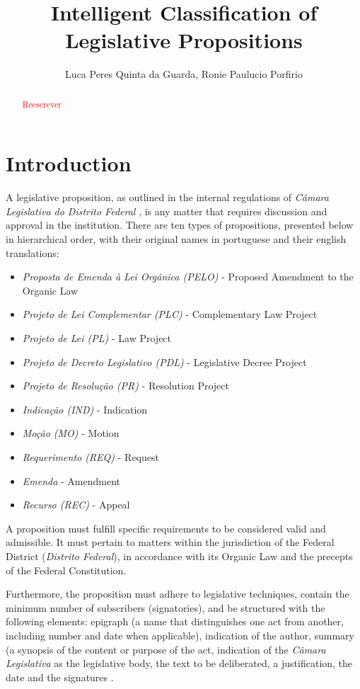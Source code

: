 \documentclass[12pt]{article}
\title{Intelligent Classification of Legislative Propositions}
\author{Luca Peres Quinta da Guarda\inst{1}, Ronie Paulucio Porfirio\inst{1}}
\begin{document}
 
	
	\maketitle
	
\begin{abstract}
	\textcolor{red}{Reescrever}
\end{abstract}

\section{Introduction}



A legislative proposition, as outlined in the internal regulations of \emph{Câmara Legislativa do Distrito Federal} \cite{CLDF2018}, is any matter that requires discussion and approval in the institution. There are ten types of propositions, presented below in hierarchical order, with their original names in portuguese and their english translations:

\begin{itemize}
	\item \emph{Proposta de Emenda à Lei Orgânica (PELO)} - Proposed Amendment to the Organic Law 
	\item \emph{Projeto de Lei Complementar (PLC)} - Complementary Law Project
	\item \emph{Projeto de Lei (PL)} - Law Project
	\item \emph{Projeto de Decreto Legislativo (PDL)} - Legislative Decree Project
	\item \emph{Projeto de Resolução (PR)} - Resolution Project 
	\item \emph{Indicação (IND)} - Indication
	\item \emph{Moção (MO)} - Motion
	\item \emph{Requerimento (REQ)} - Request
	\item \emph{Emenda} - Amendment
	\item \emph{Recurso (REC)} - Appeal
\end{itemize}

A proposition must fulfill specific requirements to be considered valid and admissible. It must pertain to matters within the jurisdiction of the Federal District (\emph{Distrito Federal}), in accordance with its Organic Law and the precepts of the Federal Constitution. 

Furthermore, the proposition must adhere to legislative techniques, contain the minimum number of subscribers (signatories), and be structured with the following elements: epigraph (a name that distinguishes one act from another, including number and date when applicable), indication of the author, summary (a synopsis of the content or purpose of the act, indication of the \emph{Câmara Legislativa} as the legislative body, the text to be deliberated, a justification, the date and the signatures \cite{Conceitos2024}.
\end{document}
